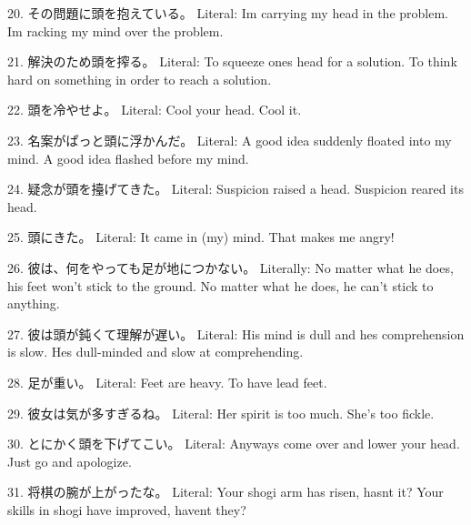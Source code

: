 \par{20. その問題に頭を抱えている。 \hfill\break
Literal: I\textquotesingle m carrying my head in the problem. \hfill\break
I\textquotesingle m racking my mind over the problem. }
 
\par{21. 解決のため頭を搾る。 \hfill\break
Literal: To squeeze one\textquotesingle s head for a solution. \hfill\break
To think hard on something in order to reach a solution. }
 
\par{22. 頭を冷やせよ。 \hfill\break
Literal: Cool your head. \hfill\break
Cool it. }
 
\par{23. 名案がぱっと頭に浮かんだ。 \hfill\break
Literal: A good idea suddenly floated into my mind. \hfill\break
A good idea flashed before my mind. }
 
\par{24. 疑念が頭を擡げてきた。 \hfill\break
Literal: Suspicion raised a head. \hfill\break
Suspicion reared its head. }
 
\par{25. 頭にきた。 \hfill\break
Literal: It came in (my) mind. \hfill\break
That makes me angry! }

\par{26. 彼は、何をやっても足が地につかない。 \hfill\break
Literally: No matter what he does, his feet won't stick to the ground. \hfill\break
No matter what he does, he can't stick to anything. }
 
\par{27. 彼は頭が鈍くて理解が遅い。 \hfill\break
Literal: His mind is dull and he\textquotesingle s comprehension is slow. \hfill\break
He\textquotesingle s dull-minded and slow at comprehending. }

\par{28. 足が重い。 \hfill\break
Literal: Feet are heavy. \hfill\break
To have lead feet. }

\par{29. 彼女は気が多すぎるね。 \hfill\break
Literal: Her spirit is too much. \hfill\break
She's too fickle. }
 
\par{30. とにかく頭を下げてこい。 \hfill\break
Literal: Anyways come over and lower your head. \hfill\break
Just go and apologize. }
 
\par{31. 将棋の腕が上がったな。 \hfill\break
Literal: Your shogi arm has risen, hasn\textquotesingle t it? \hfill\break
Your skills in shogi have improved, haven\textquotesingle t they? }

